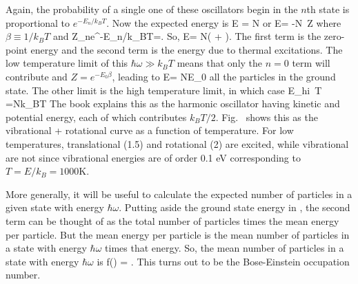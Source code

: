 \documentclass[11pt]{book}
\begin{document}
Again, the probability of a single one of these oscillators begin in the $n$th state is proportional to $e^{-E_n/k_BT}$. Now the expected energy is
\be
\langle E\rangle
= N
\ee
or
\be
\langle E\rangle = -N\frac{\partial}{\partial\beta} \,\ln Z
\ee
where $\beta\equiv 1/k_BT$ and
\be
Z\equiv \sum_ne^{-E_n/k_BT}=.\ee
So,
\be
\langle E\rangle = N\left(  +  \right).\ee
The first term is the zero-point energy and the second term is the energy due to thermal excitations.
The low temperature limit of this $\hbar\omega \gg k_BT$ means that only the $n=0$ term will contribute and $Z=e^{-E_0\beta}$, leading to
\be
\langle E\rangle = NE_0\ee
all the particles in the ground state. The other limit is the high temperature limit, in which case \be
\langle E\rangle_{hi\, T} =Nk_BT\ee
The book explains this as the harmonic oscillator having kinetic and potential energy, each of which contributes $k_BT/2$.
Fig.~ shows this as the vibrational + rotational curve as a function of temperature. For low temperatures, translational (1.5) and rotational (2) are excited, while vibrational are not since vibrational energies are of order 0.1 eV corresponding to $T=E/k_B=1000$K.
\item
More generally, it will be useful to calculate the expected number of particles in a given state with energy $\hbar\omega$. Putting aside the ground state energy in , the second term can be thought of as the total number of particles times the mean energy per particle. But the mean energy per particle is the mean number of particles in a state with energy $\hbar\omega$ times that energy. So, the mean number of particles in a state with energy $\hbar\omega$ is
\be
f(\omega) = .\ee
This turns out to be the Bose-Einstein occupation number.
\eei


\end{document}
